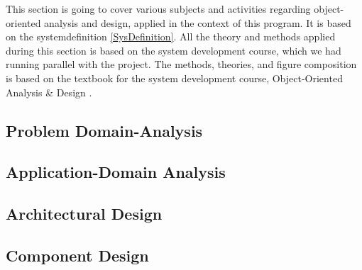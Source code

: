 This section is going to cover various subjects and activities regarding object-oriented analysis and design, applied in the context of this program. It is based on the systemdefinition \ref{SysDefinition}. All the theory and methods applied during this section is based on the system development course, which we had running parallel with the project. The methods, theories, and figure composition is based on the textbook for the system development course, Object-Oriented Analysis \& Design \cite{ObjektAnalyseDesign}.

\subsection{Problem Domain-Analysis}
\label{ProblemDomain}

\subsection{Application-Domain Analysis}
\label{ApplicationDomain}

\subsection{Architectural Design}
\label{ArchDes}

\subsection{Component Design}
\label{ComponentDesign}
